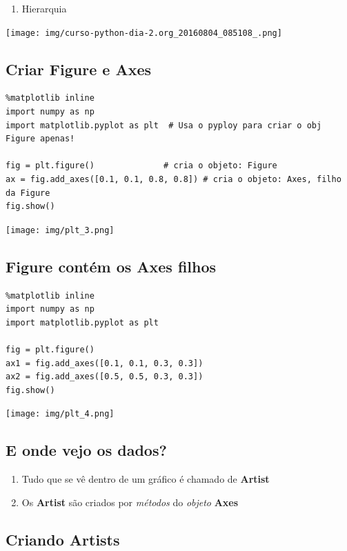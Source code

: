 \documentclass[presentation]{beamer}
\begin{document}
\begin{enumerate}
\item Hierarquia
\end{enumerate}

\texttt{[image: img/curso-python-dia-2.org\_20160804\_085108\_.png]}

\subsection{Criar Figure e Axes}
\label{sec:orgheadline33}


\begin{verbatim}
%matplotlib inline
import numpy as np
import matplotlib.pyplot as plt  # Usa o pyploy para criar o obj Figure apenas!

fig = plt.figure()              # cria o objeto: Figure
ax = fig.add_axes([0.1, 0.1, 0.8, 0.8]) # cria o objeto: Axes, filho da Figure
fig.show()
\end{verbatim}

\texttt{[image: img/plt\_3.png]}
\subsection{Figure contém os Axes filhos}
\label{sec:orgheadline34}


\begin{verbatim}
%matplotlib inline
import numpy as np
import matplotlib.pyplot as plt

fig = plt.figure()              
ax1 = fig.add_axes([0.1, 0.1, 0.3, 0.3]) 
ax2 = fig.add_axes([0.5, 0.5, 0.3, 0.3])
fig.show()
\end{verbatim}

\texttt{[image: img/plt\_4.png]}


\subsection{E onde vejo os dados?}
\label{sec:orgheadline35}

\begin{enumerate}
\item Tudo que se vê dentro de um gráfico é chamado de \textbf{Artist}
\item Os \textbf{Artist} são criados por \emph{métodos} do \emph{objeto} \textbf{Axes}
\end{enumerate}


\subsection{Criando Artists}
\label{sec:orgheadline36}
\end{document}

